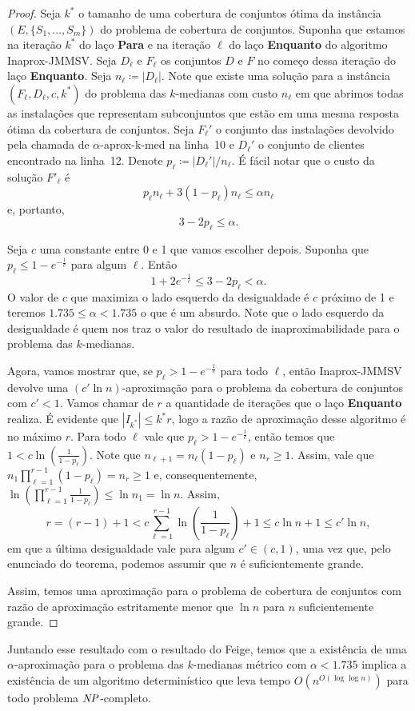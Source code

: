 \begin{proof}
Seja $k^*$ o tamanho de uma cobertura de conjuntos ótima da instância $(E,\{S_1,\ldots,S_m\})$ do problema de cobertura de conjuntos. Suponha que estamos na iteração $k^*$ do laço {\bf Para} e na iteração $\ell$ do laço {\bf Enquanto} do algoritmo {\sc Inaprox-JMMSV}.
Seja $D_\ell$ e $F_\ell$ os conjuntos $D$ e $F$ no começo dessa iteração do laço {\bf Enquanto}. Seja $n_\ell \coloneqq |D_\ell|$. Note que existe uma solução para a instância $(F_\ell,D_\ell,c,k^*)$ do problema das $k$-medianas com custo $n_\ell$ em que abrimos todas as instalações que representam subconjuntos que estão em uma mesma resposta ótima da cobertura de conjuntos.
Seja $F_\ell'$ o conjunto das instalações devolvido pela chamada de {\sc $\alpha$-aprox-k-med} na linha~10 e $D_\ell'$ o conjunto de clientes encontrado na linha~12. Denote $p_\ell \coloneqq  |D_\ell'|/n_\ell$. É fácil notar que o custo da solução $F'_\ell$ é
\[ p_\ell n_\ell + 3 (1-p_\ell) n_\ell \leq \alpha  n_\ell\]
e, portanto, 
\[3 - 2p_\ell \leq \alpha.\]

Seja $c$ uma constante entre 0 e 1 que vamos escolher depois. Suponha que ${p_\ell \leq 1 - e^{-\frac{1}{c}}}$ para algum $\ell$. 
Então
\[ 1 + 2e^{-\frac{1}{c}} \leq 3 - 2p_\ell < \alpha.\]
O valor de $c$ que maximiza o lado esquerdo da desigualdade é $c$ próximo de 1 e teremos $1.735 \leq \alpha < 1.735$ o que é um absurdo. Note que o lado esquerdo da desigualdade é quem nos traz o valor do resultado de inaproximabilidade para o problema das $k$-medianas.

Agora, vamos mostrar que, se $p_\ell > 1 - e^{ - \frac{1}{c}}$ para todo $\ell$, então {\sc Inaprox-JMMSV} devolve uma $(c'\ln n)$-aproximação para o problema da cobertura de conjuntos com $c' < 1$. Vamos chamar de $r$ a quantidade de iterações que o laço {\bf Enquanto} realiza. É evidente que $|I_{k^*}| \leq k^*r$, logo a razão de aproximação desse algoritmo é no máximo $r$. Para todo $\ell$ vale que $p_\ell > 1 - e^{ - \frac{1}{c}}$, então temos que $1 < c \ln\left( \frac{1}{1-p_\ell}\right)$. Note que $n_{\ell + 1} = n_\ell(1-p_\ell)$ e $n_r \geq 1$. Assim, vale que $n_1 \prod_{\ell =1}^{r-1} (1 - p_\ell) = n_r \geq 1$ e, consequentemente, $\ln\left(\prod_{\ell =1 }^{r-1} \frac{1}{1-p_\ell}\right) \leq \ln n_1 = \ln n$. Assim, \[ r = (r - 1) + 1 < c\sum_{\ell = 1}^{r-1} \ln \left( \frac{1}{1-p_\ell}\right) + 1 \leq c \ln n + 1 \leq c' \ln n, \]
em que a última desigualdade vale para algum $c' \in (c,1)$, uma vez que, pelo enunciado do teorema, podemos assumir que $n$ é suficientemente grande.

Assim, temos uma aproximação para o problema de cobertura de conjuntos com razão de aproximação estritamente menor que $\ln n$ para $n$ suficientemente grande.
\end{proof}

Juntando esse resultado com o resultado do Feige, temos que a existência de uma $\alpha$-aproximação para o problema das $k$-medianas métrico com $\alpha < 1.735$ implica a existência de um algoritmo determinístico que leva tempo $O(n^{O(\log \log n)})$ para todo problema $\mathit{NP}$-completo.